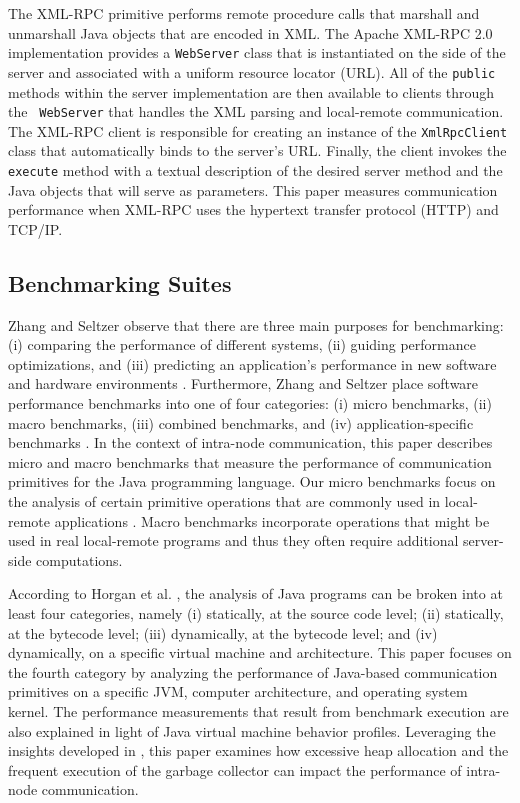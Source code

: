 \documentclass{sig-alternate}
\begin{document}
The XML-RPC primitive performs remote procedure calls that marshall
and unmarshall Java objects that are encoded in XML.  The Apache
XML-RPC 2.0 implementation provides a {\tt WebServer} class that is
instantiated on the side of the server and associated with a uniform
resource locator (URL).  All of the {\tt public} methods within the
server implementation are then available to clients through the {\tt
  WebServer} that handles the XML parsing and local-remote
communication.  The XML-RPC client is responsible for creating an
instance of the {\tt XmlRpcClient} class that automatically binds to
the server's URL. Finally, the client invokes the {\tt execute} method
with a textual description of the desired server method and the Java
objects that will serve as parameters.  This paper measures
communication performance when XML-RPC uses the hypertext transfer
protocol (HTTP) and TCP/IP.

\subsection{Benchmarking Suites}
\label{sec:benchmarking-suites}

\begin{sloppypar}
Zhang and Seltzer observe that there are three main purposes for
benchmarking: (i) comparing the performance of different systems, (ii)
guiding performance optimizations, and (iii) predicting an
application's performance in new software and hardware environments
\cite{zhang-hbenchjava}.  Furthermore, Zhang and Seltzer place
software performance benchmarks into one of four categories: (i) micro
benchmarks, (ii) macro benchmarks, (iii) combined benchmarks, and (iv)
application-specific benchmarks \cite{zhang-hbenchjava}.  In the
context of intra-node communication, this paper describes micro and
macro benchmarks that measure the performance of communication
primitives for the Java programming language.  Our micro benchmarks
focus on the analysis of certain primitive operations that are
commonly used in local-remote applications \cite{zhang-hbenchjava}.
Macro benchmarks incorporate operations that might be used in real
local-remote programs and thus they often require additional
server-side computations.
\end{sloppypar}

According to Horgan et al. \cite{horgan-measure-runtime}, the analysis
of Java programs can be broken into at least four categories, namely
(i) statically, at the source code level; (ii) statically, at the
bytecode level; (iii) dynamically, at the bytecode level; and (iv)
dynamically, on a specific virtual machine and architecture.  This
paper focuses on the fourth category by analyzing the performance of
Java-based communication primitives on a specific JVM, computer
architecture, and operating system kernel. The performance
measurements that result from benchmark execution are also explained
in light of Java virtual machine behavior profiles.  Leveraging the
insights developed in \cite{heydon-java-core}, this paper examines how
excessive heap allocation and the frequent execution of the garbage
collector can impact the performance of intra-node communication.
\end{document}
